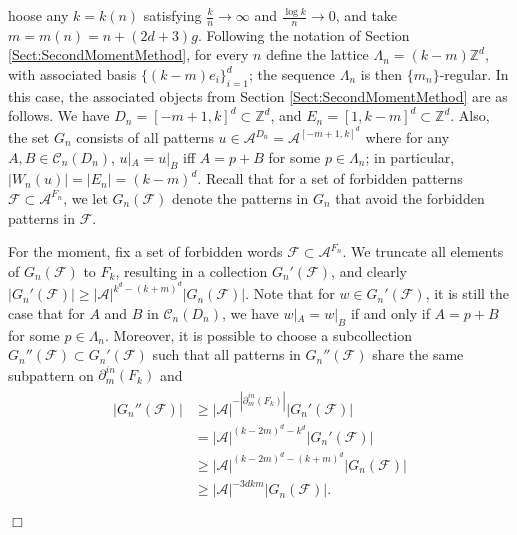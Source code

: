 \documentclass[12pt]{amsart}
\theoremstyle{definition}
\newenvironment{ProofOfFactorThm}[1]
{\par\vskip2\parsep\noindent{\sc Proof of Theorem\ \ref{Thm:Factors}. }}{{\hfill
$\Box$}
\par\vskip2\parsep}
\begin{document}
\begin{ProofOfFactorThm}
Choose any $k = k(n)$ satisfying $\frac{k}{n} \rightarrow \infty$ and $\frac{\log k}{n} \rightarrow 0$, and take $m = m(n) = n + (2d+3)g$. Following the notation of Section \ref{Sect:SecondMomentMethod}, for every $n$ define the lattice $\Lambda_n = (k-m)\mathbb{Z}^d$, with associated basis $\{(k-m)e_i\}_{i=1}^d$; the sequence $\Lambda_n$ is then $\{m_n\}$-regular. In this case, the associated objects from Section \ref{Sect:SecondMomentMethod} are as follows. We have $D_n = [-m+1, k]^d \subset \mathbb{Z}^d$, and $E_n = [1, k-m]^d \subset \mathbb{Z}^d$. Also, the set $G_n$ consists of all patterns $u \in \mathcal{A}^{D_n} = \mathcal{A}^{[-m+1,k]^d}$ where for any $A,B \in \mathcal{C}_n(D_n)$, $u|_A = u|_{B}$ iff $A = p + B$ for some $p \in \Lambda_n$; in particular, $|W_n(u)| = |E_n| = (k-m)^d$.
Recall that for a set of forbidden patterns $\mathcal{F} \subset \mathcal{A}^{F_n}$, we let $G_n(\mathcal{F})$ denote the patterns in $G_n$ that avoid the forbidden patterns in $\mathcal{F}$.

For the moment, fix a set of forbidden words $\mathcal{F} \subset \mathcal{A}^{F_n}$. 
We truncate all elements of $G_n(\mathcal{F})$ to $F_k$, resulting in a collection $G_n'(\mathcal{F})$, and clearly $|G_n'(\mathcal{F})| \geq |\mathcal{A}|^{k^d - (k+m)^d} |G_n(\mathcal{F})|$. Note that for $w \in G_n'(\mathcal{F})$, it is still the case that for $A$ and $B$ in $\mathcal{C}_n(D_n)$, we have $w|_A = w|_B$ if and only if $A = p+B$ for some $p \in \Lambda_n$. Moreover, it is possible to choose a subcollection $G_n''(\mathcal{F}) \subset G_n'(\mathcal{F})$ such that all patterns in $G_n''(\mathcal{F})$ share the same subpattern on 
$\partial^{in}_m(F_k)$ and 
\begin{align} 
\begin{split} \label{Eqn:Ducks}
|G_n''(\mathcal{F})| & \geq |\mathcal{A}|^{-|\partial^{in}_m(F_k)|} |G_n'(\mathcal{F})| \\
& = |\mathcal{A}|^{(k-2m)^d - k^d} |G_n'(\mathcal{F})| \\
& \geq |\mathcal{A}|^{(k-2m)^d - (k+m)^d} |G_n(\mathcal{F})| \\
& \geq |\mathcal{A}|^{-3dkm} |G_n(\mathcal{F})|.
 \end{split}
\end{align}


\end{ProofOfFactorThm}
\end{document}

